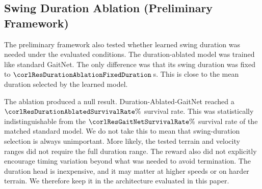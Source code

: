 \subsection{Swing Duration Ablation (Preliminary Framework)}
\label{subsec:results-duration-ablation}

The preliminary framework \cite{Sullivan2025} also tested whether
learned swing duration was needed under the evaluated conditions. The
duration-ablated model was trained like standard GaitNet. The only
difference was that its swing duration was fixed to
$\corlResDurationAblationFixedDuration$\,s. This is close to the mean
duration selected by the learned model.

The ablation produced a null result. Duration-Ablated-GaitNet reached
a $\corlResDurationAblatedSurvivalRate\%$ survival rate. This was
statistically indistinguishable from the
$\corlResGaitNetSurvivalRate\%$ survival rate of the matched standard
model. We do not take this to mean that swing-duration selection is
always unimportant. More likely, the tested terrain and velocity
ranges did not require the full duration range. The reward also did
not explicitly encourage timing variation beyond what was needed to
avoid termination. The duration head is inexpensive, and it may matter
at higher speeds or on harder terrain. We therefore keep it in the
architecture evaluated in this paper.
